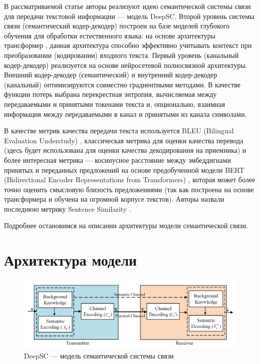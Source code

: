 \documentclass[a4paper,12pt]{article}
\begin{document}
	В рассматриваемой статье \cite{xie2021sem} авторы реализуют идею семантической системы связи для передачи текстовой информации --- модель DeepSC. Второй уровень системы связи (семантический кодер-декодер) построен на базе моделей глубокого обучения для обработки естественного языка: на основе архитектуры трансформер \cite{vaswani2017tr}, данная архитектура способно эффективно учитывать контекст при преобразовании (кодировании) входного текста. Первый уровень (канальный кодер-декодер) реализуется на основе нейросетевой полносвязной архитектуры. Внешний кодер-декодер (семантический) и внутренний кодер-декодер (канальный) оптимизируются совместно градиентными методами. В качестве функции потерь выбрана перекрестная энтропия, вычисляемая между передаваемыми и принятыми токенами текста и, опционально, взаимная информация между передаваемыми в канал и принятыми из канала символами.
	
	В качестве метрик качества передачи текста используется BLEU (Bilingual Evaluation Understudy) \cite{papineli2002bleu}, классическая метрика для оценки качества перевода (здесь будет использована для оценки качества декодирования на приемника) и более интересная метрика --- косинусное расстояние между эмбеддигнами принятых и переданных предложений на основе предобученной модели BERT (Bidirectional Encoder Representations from Transformers) \cite{devlin2018bert}, которая может более точно оценить смысловую близость предложениями (так как построена на основе трансформера и обучена на огромной корпусе текстов). Авторы назвали последнюю метрику Sentence Similarity \cite{xie2021sem}.
	
	Подробнее остановимся на описании архитектуры модели семантической связи.
	
	\section*{Архитектура модели}
	
	\begin{figure}[h!]
		\centering
		\includegraphics[width=0.6\linewidth]{figures/semcom}
		\caption{DeepSC --- модель семантической системы связи}
		\label{fig:semcom}
	\end{figure}
	
\end{document}
